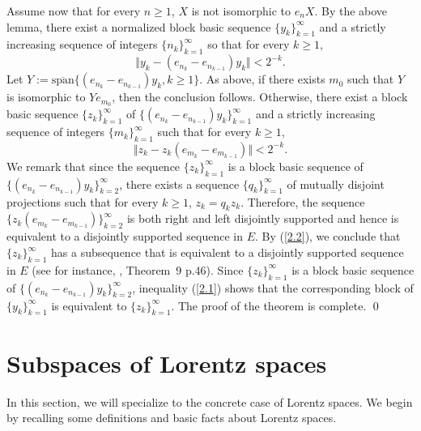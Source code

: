 \documentclass[12pt]{amsart}
\numberwithin{equation}{section}
\numberwithin{theorem}{section}
\begin{document}
Assume now that for every $n \geq 1$, $X$ is not isomorphic to 
$e_nX$. By the above lemma, there exist a normalized 
block basic sequence $\{y_k\}_{k=1}^\infty$
and a strictly increasing sequence of integers $\{n_k\}_{k=1}^\infty$
so that for every $k \geq 1$,
\begin{equation}\label{2.1}
\Vert y_k - (e_{n_k}- e_{n_{k-1}})y_k\Vert < 2^{-k}.
\end{equation}
Let $Y:=\overline{\text{span}}\{(e_{n_k}- e_{n_{k-1}})y_k, k\geq 1\}$.
As above, if there exists $m_0$ such that $Y$ is isomorphic to $Ye_{m_0}$,
then the conclusion follows. Otherwise,
there exist a block basic sequence $\{z_k\}_{k=1}^\infty$ of 
$\{(e_{n_k}- e_{n_{k-1}})y_k\}_{k=1}^\infty$ and a
strictly increasing sequence of 
integers $\{m_k\}_{k=1}^\infty$ such that for every $k\geq 1$,
\begin{equation}\label{2.2} 
\Vert z_k -z_k(e_{m_k}- e_{m_{k-1}})\Vert <2^{-k}.
\end{equation}
We remark that since the sequence $\{z_k\}_{k=1}^\infty$ is a block basic sequence of
$\{(e_{n_k}- e_{n_{k-1}})y_k\}_{k=2}^\infty$, there exists a sequence 
$\{q_k\}_{k=1}^\infty$ of
mutually disjoint projections  such that for every $k\geq 1$,
$z_k=q_kz_k$. Therefore, the sequence
$\{z_k(e_{m_k}- e_{m_{k-1}})\}_{k=2}^\infty$  is both right and left
disjointly supported and hence is equivalent to a disjointly supported
sequence in $E$. By (\ref{2.2}), we conclude that $\{z_k\}_{k=1}^\infty$ 
has a subsequence that is equivalent 
to a disjointly supported sequence in $E$ (see for instance,
\cite{D1}, Theorem~9 p.46). Since 
$\{z_k\}_{k=1}^\infty$ is a block basic
sequence of $\{(e_{n_k}- e_{n_{k-1}})y_k\}_{k=2}^\infty$, inequality (\ref{2.1}) 
shows
that the corresponding  block  of $\{y_k\}_{k=1}^\infty$  is equivalent to
$\{z_k\}_{k=1}^\infty$. The proof of the theorem is complete.
\qed


 
\section{Subspaces of Lorentz spaces}

In this section, we will specialize to the concrete case of Lorentz
spaces. We begin by recalling some definitions and 
basic facts about Lorentz spaces.
\end{document}
